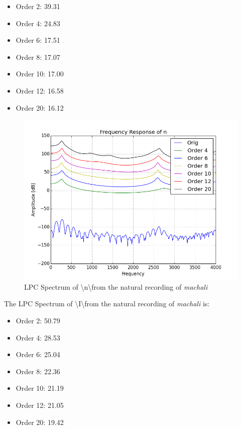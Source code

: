 \documentclass[a4paper]{article}
\begin{document}
\begin{itemize}
\item Order 2: 39.31 
\item Order 4: 24.83
\item Order 6: 17.51
\item Order 8: 17.07
\item Order 10: 17.00
\item Order 12: 16.58
\item Order 20: 16.12
\end{itemize}  
\begin{figure}[h!]
    \includegraphics[width=\linewidth]{./images/freq_resp_n.png}
    \caption{LPC Spectrum of \textbackslash n\textbackslash from the natural recording of \textit{machali}}
    \label{fig:1}
\end{figure}


The LPC Spectrum of \textbackslash I\textbackslash from the natural recording of \textit{machali} is: 
\begin{itemize}
\item Order 2: 50.79 
\item Order 4: 28.53
\item Order 6: 25.04
\item Order 8: 22.36
\item Order 10: 21.19
\item Order 12: 21.05
\item Order 20: 19.42
\end{itemize}  
\end{document}
